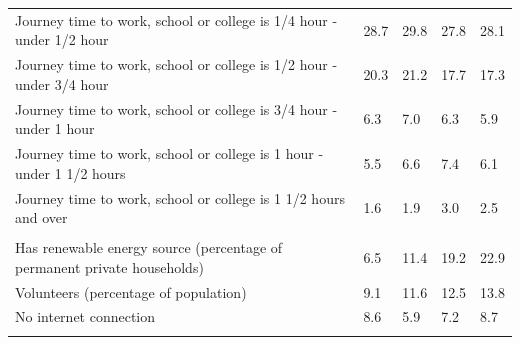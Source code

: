 \documentclass{article}
\begin{document}
\begin{table}[h]
\begin{tabular}{KTTTT}
Journey time to work, school or college is 1/4 hour - under 1/2 hour & 28.7& 29.8& 27.8& 28.1\\
Journey time to work, school or college is 1/2 hour - under 3/4 hour & 20.3& 21.2& 17.7& 17.3\\
Journey time to work, school or college is 3/4 hour - under 1 hour & 6.3& 7.0& 6.3& 5.9\\
Journey time to work, school or college is 1 hour - under 1 1/2 hours & 5.5& 6.6& 7.4& 6.1\\
Journey time to work, school or college is 1 1/2 hours and over & 1.6& 1.9& 3.0& 2.5\\
\hline
    \\ 
    \hline
Has renewable energy source (percentage of permanent private households) &  6.5& 11.4& 19.2& 22.9\\
    \hline
Volunteers (percentage of population) &  9.1& 11.6& 12.5& 13.8\\
    \hline
No internet connection& 8.6& 5.9& 7.2& 8.7\\
\hline
\end{tabular}
\end{table}
\end{document}
